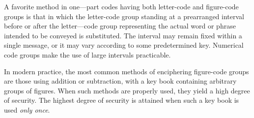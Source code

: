 \mypara A favorite method in one—part codes having both letter-code and
ﬁgure-code groups is that in which the letter-code group standing at a
prearranged interval before or after the letter—code group representing
the actual word or phrase intended to be conveyed is substituted. The
interval may remain ﬁxed within a single message, or it may vary according to some predetermined key. Numerical code groups make the use of
large intervals practicable.

\mypara In modern practice, the most common methods of enciphering
ﬁgure-code groups are those using addition or subtraction, with a key
book containing arbitrary groups of ﬁgures. When such methods are
properly used, they yield a high degree of security. The highest degree
of security is attained when such a key book is used \textit{only once}.
